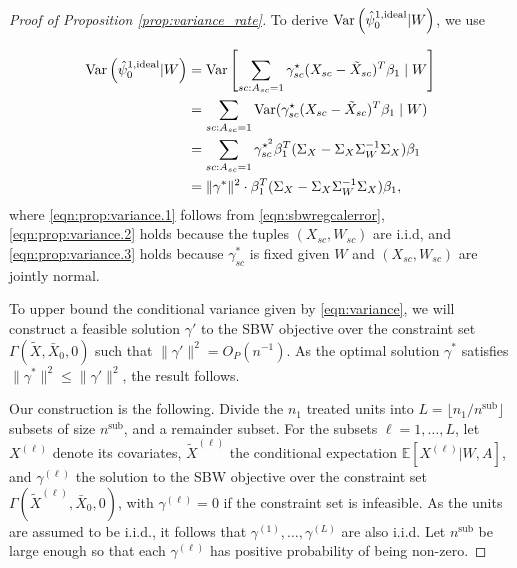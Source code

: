 \begin{proof}[Proof of Proposition \ref{prop:variance_rate}] 
To derive $\operatorname{Var}\left(\hat{\psi}_0^{1,\textup{ideal}} | W\right)$, we use

\begin{align}
\operatorname{Var}\left(\hat{\psi}_0^{1,\textup{ideal}} | W\right) &= \operatorname{Var}\left[\sum_{sc: A_{sc} = 1}\gamma_{sc}^\star(X_{sc} - \tilde{X}_{sc})^T\beta_1 \mid W\right] \label{eqn:prop:variance.1}\\
 &= \sum_{sc: A_{sc} = 1} \operatorname{Var}(\gamma_{sc}^\star(X_{sc} - \tilde{X}_{sc})^T\beta_1 \mid W) \label{eqn:prop:variance.2}\\
 &= \sum_{sc: A_{sc} = 1} \gamma_{sc}^{\star^2}\beta_1^T(\Sigma_{X} - \Sigma_{X}\Sigma_{W}^{-1}\Sigma_{X})\beta_1  \label{eqn:prop:variance.3}\\
& = \|\gamma^*\|^2 \cdot \beta_1^T(\Sigma_{X} - \Sigma_{X}\Sigma_{W}^{-1}\Sigma_{X})\beta_1,  \label{eqn:variance}
\end{align}
%
where \eqref{eqn:prop:variance.1} follows from \eqref{eqn:sbwregcalerror}, \eqref{eqn:prop:variance.2} holds because the tuples $(X_{sc}, W_{sc})$ are i.i.d, and \eqref{eqn:prop:variance.3} holds because $\gamma_{sc}^*$ is fixed given $W$ and $(X_{sc}, W_{sc})$ are jointly normal. 




To upper bound the conditional variance given by \eqref{eqn:variance}, we will construct a feasible solution $\gamma'$ to the SBW objective over the constraint set $\Gamma(\tilde{X}, \bar{X}_0, 0)$ such that $\|\gamma'\|^2 = O_P(n^{-1})$. As the optimal solution $\gamma^*$ satisfies $\|\gamma^*\|^2 \leq \|\gamma'\|^2$, the result follows.

Our construction is the following. Divide the $n_1$ treated units into $L = \lfloor n_1/n^{\text{sub}} \rfloor$ subsets of size $n^{\text{sub}}$, and a remainder subset. For the subsets $\ell=1,\ldots,L$, let $X^{(\ell)}$ denote its covariates, $\tilde{X}^{(\ell)}$ the conditional expectation $\mathbb{E}[X^{(\ell)}|W, A]$, and  $\gamma^{(\ell)}$ the solution to the SBW objective over the constraint set $\Gamma(\tilde{X}^{(\ell)}, \bar{X}_0, 0)$, with $\gamma^{(\ell)}=0$ if the constraint set is infeasible. As the units are assumed to be i.i.d., it follows that $\gamma^{(1)}, \ldots, \gamma^{(L)}$ are also i.i.d. Let $n^{\text{sub}}$ be large enough so that each $\gamma^{(\ell)}$ has positive probability of being non-zero. 


\end{proof}
